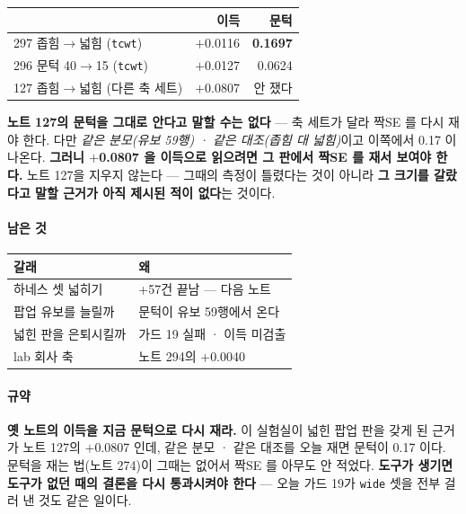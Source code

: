 \documentclass[10pt]{article}
\begin{document}
\begin{center}\footnotesize
\begin{tabular}{lrr}
\hline
& 이득 & 문턱 \\
\hline
297 좁힘$\to$넓힘 (\texttt{tcwt}) & $+$0.0116 & \textbf{0.1697} \\
296 문턱 40$\to$15 (\texttt{tcwt}) & $+$0.0127 & 0.0624 \\
\hline
127 좁힘$\to$넓힘 (다른 축 세트) & $+$0.0807 & 안 쟀다 \\
\hline
\end{tabular}
\end{center}

\textbf{노트 127의 문턱을 그대로 안다고 말할 수는 없다} --- 축 세트가 달라
짝SE 를 다시 재야 한다. 다만 \emph{같은 분모(유보 59행) · 같은 대조(좁힘 대
넓힘)}이고 이쪽에서 0.17 이 나온다. \textbf{그러니 $+$0.0807 을 이득으로 읽으려면
그 판에서 짝SE 를 재서 보여야 한다.} 노트 127을 지우지 않는다 --- 그때의
측정이 틀렸다는 것이 아니라 \textbf{그 크기를 갈랐다고 말할 근거가 아직
제시된 적이 없다}는 것이다.

\paragraph{남은 것}
\begin{center}\small
\begin{tabular}{ll}
\hline
갈래 & 왜 \\
\hline
하네스 셋 넓히기 & +57건 끝남 --- 다음 노트 \\
팝업 유보를 늘릴까 & 문턱이 유보 59행에서 온다 \\
넓힌 판을 은퇴시킬까 & 가드 19 실패 · 이득 미검출 \\
lab 회사 축 & 노트 294의 $+$0.0040 \\
\hline
\end{tabular}
\end{center}

\paragraph{규약} \textbf{옛 노트의 이득을 지금 문턱으로 다시 재라.} 이
실험실이 넓힌 팝업 판을 갖게 된 근거가 노트 127의 $+$0.0807 인데, 같은
분모 · 같은 대조를 오늘 재면 문턱이 0.17 이다. 문턱을 재는 법(노트 274)이
그때는 없어서 짝SE 를 아무도 안 적었다. \textbf{도구가 생기면 도구가 없던 때의 결론을 다시 통과시켜야
한다} --- 오늘 가드 19가 \texttt{wide} 셋을 전부 걸러 낸 것도 같은 일이다.
\end{document}
